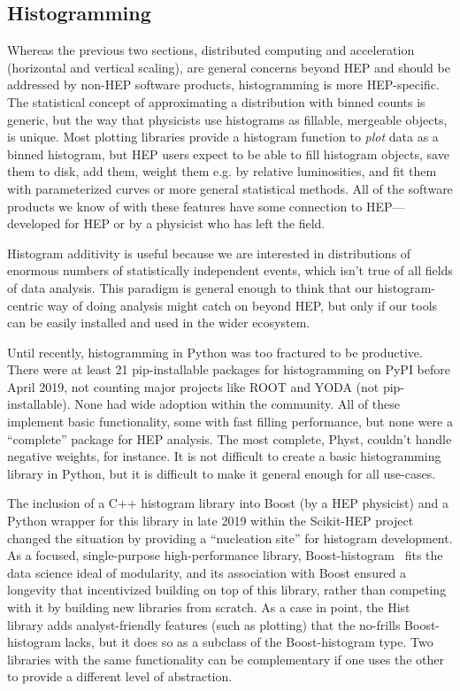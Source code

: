 \documentclass[12pt,a4paper]{article}
\begin{document}
\subsection{Histogramming}

Whereas the previous two sections, distributed computing and acceleration (horizontal and vertical scaling), are general concerns beyond HEP and should be addressed by non-HEP software products, histogramming is more HEP-specific. The statistical concept of approximating a distribution with binned counts is generic, but the way that physicists use histograms as fillable, mergeable objects, is unique. Most plotting libraries provide a histogram function to {\it plot} data as a binned histogram, but HEP users expect to be able to fill histogram objects, save them to disk, add them, weight them e.g. by relative luminosities, and fit them with parameterized curves or more general statistical methods. All of the software products we know of with these features have some connection to HEP---developed for HEP or by a physicist who has left the field.

Histogram additivity is useful because we are interested in distributions of enormous numbers of statistically independent events, which isn't true of all fields of data analysis. This paradigm is general enough to think that our histogram-centric way of doing analysis might catch on beyond HEP, but only if our tools can be easily installed and used in the wider ecosystem.

Until recently, histogramming in Python was too fractured to be productive. There were at least 21 pip-installable packages for histogramming on PyPI before April 2019, not counting major projects like ROOT and YODA (not pip-installable). None had wide adoption within the community. All of these implement basic functionality, some with fast filling performance, but none were a ``complete'' package for HEP analysis. The most complete, Physt, couldn't handle negative weights, for instance. It is not difficult to create a basic histogramming library in Python, but it is difficult to make it general enough for all use-cases.

The inclusion of a C++ histogram library into Boost (by a HEP physicist) and a Python wrapper for this library in late 2019 within the Scikit-HEP project changed the situation by providing a ``nucleation site'' for histogram development. As a focused, single-purpose high-performance library, Boost-histogram~\cite{henry_schreiner-proc-scipy-2020} fits the data science ideal of modularity, and its association with Boost ensured a longevity that incentivized building on top of this library, rather than competing with it by building new libraries from scratch. As a case in point, the Hist~\cite{Dembinski:2020dic} library adds analyst-friendly features (such as plotting) that the no-frills Boost-histogram lacks, but it does so as a subclass of the Boost-histogram type. Two libraries with the same functionality can be complementary if one uses the other to provide a different level of abstraction.
\end{document}
